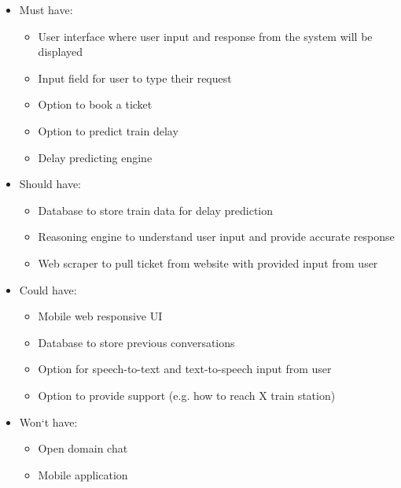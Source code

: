 \documentclass[11pt]{article}
\begin{document}
    \begin{itemize}
        \item  Must have:
        \begin{itemize}
            \item User interface where user input and response from the system will be displayed
            \item Input field for user to type their request
            \item Option to book a ticket
            \item Option to predict train delay
            \item Delay predicting engine
        \end{itemize}
    \end{itemize}
    \begin{itemize}
        \item Should have:
        \begin{itemize}
            \item Database to store train data for delay prediction
            \item Reasoning engine to understand user input and provide accurate response
            \item Web scraper to pull ticket from website with provided input from user
        \end{itemize}
    \end{itemize}
    \begin{itemize}
        \item Could have:
        \begin{itemize}
            \item Mobile web responsive UI
            \item Database to store previous conversations
            \item Option for speech-to-text and text-to-speech input from user
            \item Option to provide support (e.g. how to reach X train station)
        \end{itemize}
    \end{itemize}
    \begin{itemize}
        \item Won`t have:
        \begin{itemize}
            \item Open domain chat
            \item Mobile application
        \end{itemize}
    \end{itemize}
\end{document}
